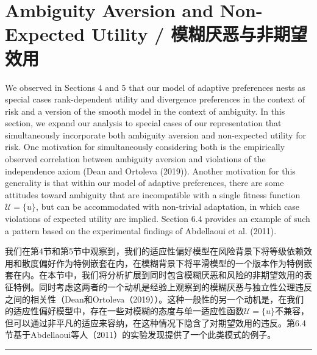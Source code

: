 \documentclass[12pt,a4paper]{article}
\newenvironment{original}
  {\par\noindent\color{black}\smallskip}
  {\par\smallskip}
\newenvironment{translation}
  {\par\noindent\color{blue!70!black}\smallskip}
  {\par\medskip\hrule\medskip}
\begin{document}
\section{Ambiguity Aversion and Non-Expected Utility / 模糊厌恶与非期望效用}

\begin{original}
We observed in Sections 4 and 5 that our model of adaptive preferences nests as special cases rank-dependent utility and divergence preferences in the context of risk and a version of the smooth model in the context of ambiguity. In this section, we expand our analysis to special cases of our representation that simultaneously incorporate both ambiguity aversion and non-expected utility for risk. One motivation for simultaneously considering both is the empirically observed correlation between ambiguity aversion and violations of the independence axiom (Dean and Ortoleva (2019)). Another motivation for this generality is that within our model of adaptive preferences, there are some attitudes toward ambiguity that are incompatible with a single fitness function $\mathcal{U} = \{u\}$, but can be accommodated with non-trivial adaptation, in which case violations of expected utility are implied. Section 6.4 provides an example of such a pattern based on the experimental findings of Abdellaoui et al. (2011).
\end{original}
\begin{translation}
我们在第4节和第5节中观察到，我们的适应性偏好模型在风险背景下将等级依赖效用和散度偏好作为特例嵌套在内，在模糊背景下将平滑模型的一个版本作为特例嵌套在内。在本节中，我们将分析扩展到同时包含模糊厌恶和风险的非期望效用的表征特例。同时考虑这两者的一个动机是经验上观察到的模糊厌恶与独立性公理违反之间的相关性（Dean和Ortoleva（2019））。这种一般性的另一个动机是，在我们的适应性偏好模型中，存在一些对模糊的态度与单一适应性函数$\mathcal{U} = \{u\}$不兼容，但可以通过非平凡的适应来容纳，在这种情况下隐含了对期望效用的违反。第6.4节基于Abdellaoui等人（2011）的实验发现提供了一个此类模式的例子。
\end{translation}
\end{document}
